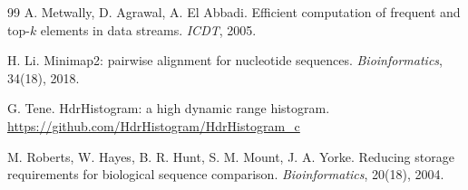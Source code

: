 \documentclass[sigconf,nonacm]{acmart}
\begin{document}
\begin{thebibliography}{99}
 A. Metwally, D. Agrawal, A. El Abbadi. Efficient computation of frequent
and top-$k$ elements in data streams. \emph{ICDT}, 2005.

 H. Li. Minimap2: pairwise alignment for nucleotide sequences.
\emph{Bioinformatics}, 34(18), 2018.

 G. Tene. HdrHistogram: a high dynamic range histogram.
\url{https://github.com/HdrHistogram/HdrHistogram_c}

 M. Roberts, W. Hayes, B. R. Hunt, S. M. Mount, J. A. Yorke. Reducing
storage requirements for biological sequence comparison. \emph{Bioinformatics}, 20(18), 2004.

\end{thebibliography}
\end{document}

